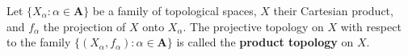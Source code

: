 Let $\{X_\alpha : \alpha \in \mathbf{A}\}$ be a family of topological spaces, $X$ their Cartesian product, and $f_\alpha$ the projection of $X$ onto $X_\alpha$. The projective topology on $X$ with respect to the family $\{(X_\alpha, f_\alpha) : \alpha \in \mathbf{A}\}$ is called the \textbf{product topology} on $X$.

